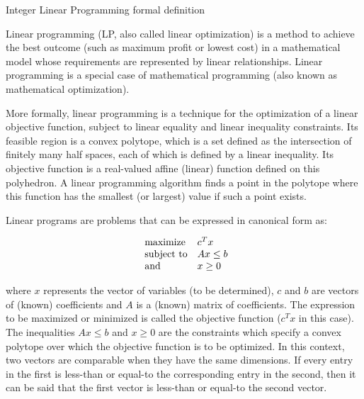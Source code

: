 \documentclass[9pt]{extarticle}
\begin{document}
    \begin{section}{Integer Linear Programming formal definition}

        Linear programming (LP, also called linear optimization) is a method to achieve the best outcome (such as maximum 
        profit or lowest cost) in a mathematical model whose requirements are represented by linear relationships. 
        Linear programming is a special case of mathematical programming (also known as mathematical optimization).
        \cite{wiki:lp}

        More formally, linear programming is a technique for the optimization of a linear objective function, subject to 
        linear equality and linear inequality constraints. 
        Its feasible region is a convex polytope, which is a set defined as the intersection of finitely many half spaces, 
        each of which is defined by a linear inequality. 
        Its objective function is a real-valued affine (linear) function defined on this polyhedron. 
        A linear programming algorithm finds a point in the polytope where this function has the smallest (or largest) 
        value if such a point exists.
        \cite{wiki:lp}

        Linear programs are problems that can be expressed in canonical form as:
        
        \begin{equation*}
            \begin{array}{ll@{}ll}
                \text{maximize}  & c^{T}x \\
                \text{subject to} & Ax \leq b \\
                \text{and} & x \ge 0
            \end{array}
        \end{equation*}

        where $x$ represents the vector of variables (to be determined), $c$ and $b$ are vectors of (known) coefficients and 
        $A$ is a (known) matrix of coefficients.
        The expression to be maximized or minimized is called the objective function ($c^{T}x$ in this case). 
        The inequalities $Ax \leq b$ and $x \ge 0$ are the constraints which specify a convex polytope over which the objective 
        function is to be optimized. 
        In this context, two vectors are comparable when they have the same dimensions. 
        If every entry in the first is less-than or equal-to the corresponding entry in the second, then it can be said 
        that the first vector is less-than or equal-to the second vector.
        \cite{wiki:lp}


\end{section}
\end{document}
